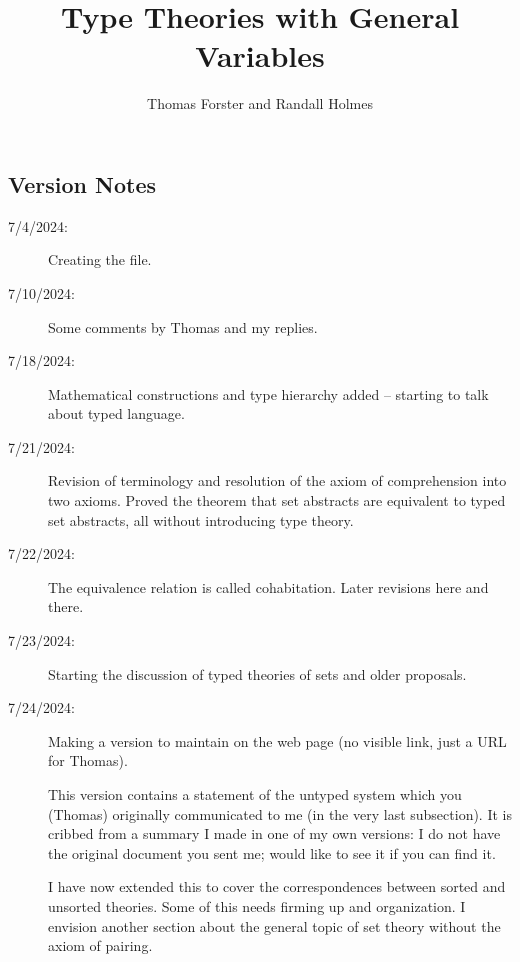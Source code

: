 \documentclass[12pt]{article}
\title{Type Theories with General Variables}
\author{Thomas Forster and Randall Holmes}
\begin{document}
\maketitle

\tableofcontents

\subsection{Version Notes}

\begin{description}

\item[7/4/2024:]  Creating the file.

\item[7/10/2024:]  Some comments by Thomas and my replies.


\item[7/18/2024:]  Mathematical constructions and type hierarchy added -- starting to talk about typed language.

\item[7/21/2024:]  Revision of terminology and resolution of the axiom of comprehension into two axioms.  Proved the theorem that set abstracts are equivalent to typed set abstracts, all without introducing type theory.

\item[7/22/2024:]  The equivalence relation is called cohabitation.  Later revisions here and there.

\item[7/23/2024:]  Starting the discussion of typed theories of sets and older proposals.

\item[7/24/2024:]  Making a version to maintain on the web page (no visible link, just a URL for Thomas).

This version contains a statement of the untyped system which you (Thomas) originally communicated to me (in the very last subsection).  It is cribbed from a summary I made in one of my own versions:  I do not have the original document you sent me;  would like to see it if you can find it.

I have now extended this to cover the correspondences between sorted and unsorted theories.  Some of this needs firming up and organization.
I envision another section about the general topic of set theory without the axiom of pairing.

\end{description}
\end{document}
